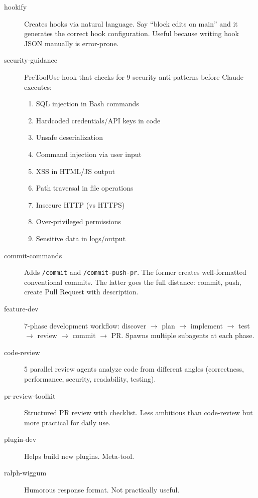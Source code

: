 \documentclass[11pt,a4paper]{article}
\begin{document}
\begin{description}
  \item[hookify] Creates hooks via natural language. Say ``block edits on main'' and it generates the correct hook configuration. Useful because writing hook JSON manually is error-prone.

  \item[security-guidance] PreToolUse hook that checks for 9 security anti-patterns before Claude executes:
  \begin{enumerate}
    \item SQL injection in Bash commands
    \item Hardcoded credentials/API keys in code
    \item Unsafe deserialization
    \item Command injection via user input
    \item XSS in HTML/JS output
    \item Path traversal in file operations
    \item Insecure HTTP (vs HTTPS)
    \item Over-privileged permissions
    \item Sensitive data in logs/output
  \end{enumerate}

  \item[commit-commands] Adds \texttt{/commit} and \texttt{/commit-push-pr}. The former creates well-formatted conventional commits. The latter goes the full distance: commit, push, create Pull Request with description.

  \item[feature-dev] 7-phase development workflow: discover $\rightarrow$ plan $\rightarrow$ implement $\rightarrow$ test $\rightarrow$ review $\rightarrow$ commit $\rightarrow$ PR. Spawns multiple subagents at each phase.

  \item[code-review] 5 parallel review agents analyze code from different angles (correctness, performance, security, readability, testing).

  \item[pr-review-toolkit] Structured PR review with checklist. Less ambitious than code-review but more practical for daily use.

  \item[plugin-dev] Helps build new plugins. Meta-tool.

  \item[ralph-wiggum] Humorous response format. Not practically useful.


\end{description}
\end{document}
